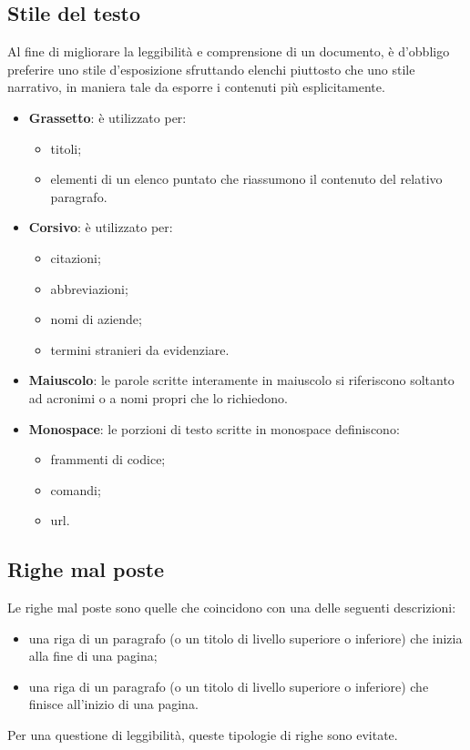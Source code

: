 \subsection{Stile del testo}
 Al fine di migliorare la leggibilità e comprensione di un documento, è d'obbligo preferire uno stile d'esposizione sfruttando elenchi piuttosto che uno stile narrativo, in maniera tale da esporre i contenuti più esplicitamente.
\begin{itemize}
	\item \textbf{Grassetto}: è utilizzato per:
	\begin{itemize}
		\item titoli;
		\item elementi di un elenco puntato che riassumono il contenuto del relativo paragrafo.
	\end{itemize}
	\item \textbf{Corsivo}: è utilizzato per:
	\begin{itemize}
		\item citazioni;
		\item abbreviazioni;
		\item nomi di aziende;
		\item termini stranieri da evidenziare.
	\end{itemize}
	\item \textbf{Maiuscolo}: le parole scritte interamente in maiuscolo si riferiscono soltanto ad acronimi o a nomi propri che lo richiedono.
	\newpage
	\item \textbf{Monospace}: le porzioni di testo scritte in monospace definiscono:
	\begin{itemize}
		\item frammenti di codice;
		\item comandi;
		\item \gls{url}.
	\end{itemize}
\end{itemize}

\subsection{Righe mal poste}
Le righe mal poste sono quelle che coincidono con una delle seguenti descrizioni:
\begin{itemize}
	\item una riga di un paragrafo (o un titolo di livello superiore o inferiore) che inizia alla fine di una pagina;
	\item una riga di un paragrafo (o un titolo di livello superiore o inferiore) che finisce all'inizio di una pagina.
\end{itemize}
Per una questione di leggibilità, queste tipologie di righe sono evitate.\\
